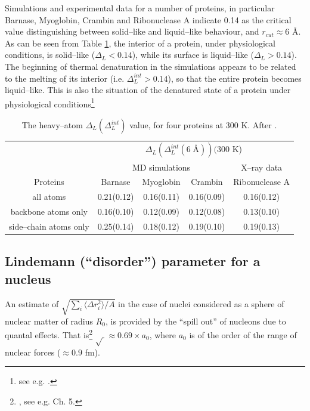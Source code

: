 \begin{subappendices}
Simulations and experimental data for a number of proteins, in particular Barnase, Myoglobin, Crambin and Ribonuclease A indicate 0.14 as the critical value distinguishing between solid--like and liquid--like behaviour, and $r_{cut}\approx 6$ \AA. As can be seen from Table \ref{tab2C1}, the interior of a protein, under physiological conditions, is solid--like  ($\Delta_L<0.14$), while its surface is liquid--like ($\Delta_L>0.14$). The beginning of thermal denaturation in the simulations appears to be related to the melting of its interior (i.e. $\Delta^{int}_L>0.14$), so that the entire protein becomes liquid--like. This is also the situation of the denatured state of a protein under physiological conditions\footnote{see e.g. \cite{Rosner:17}.} 



\begin{table}[h]
 \begin{tabular}{|c|c|c|c|c|}
 \hline
 &\multicolumn{4}{|c|}{$\Delta_L(\Delta_L^{int}(6\;\text{\AA}))(300$ K)}\\
 \cline{2-5}
 &\multicolumn{3}{|c|}{MD simulations}&X--ray data\\
 \hline
 Proteins&Barnase&Myoglobin&Crambin&Ribonuclease A\\
 \hline
 all atoms&0.21(0.12)&0.16(0.11)&0.16(0.09)&0.16(0.12)\\
 backbone atoms only&0.16(0.10)&0.12(0.09)&0.12(0.08)&0.13(0.10)\\
 side--chain atoms only&0.25(0.14)&0.18(0.12)&0.19(0.10)&0.19(0.13)\\
 \hline
 \end{tabular}
 \caption{The heavy--atom $\Delta_L(\Delta_L^{int})$ value, for four proteins at 300 K. After \cite{Zhou:99}.}\label{tab2C1}
 \end{table}

\subsection{Lindemann (``disorder'') parameter for a nucleus}
An estimate of  $\sqrt{\sum_i\langle \Delta r_i^2\rangle/A}$ in the case of nuclei considered as a sphere of nuclear matter of radius $R_0$, is provided by the ``spill out'' of nucleons due to quantal effects. That is\footnote{\cite{Bertsch:05}, see e.g. Ch. 5.} $\sqrt{\;}\approx 0.69\times a_0$, where $a_0$ is of the order of the range of nuclear forces ($\approx 0.9$ fm).



\end{subappendices}
